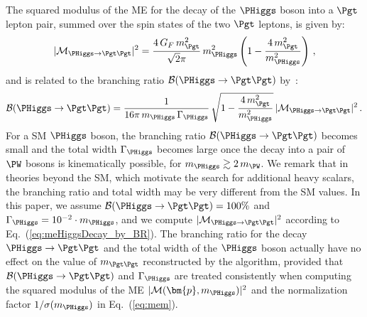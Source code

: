 The squared modulus of the ME for the decay of the $\PHiggs$ boson
into a $\Pgt$ lepton pair, summed over the spin states of the two $\Pgt$ leptons, is given by:
\begin{equation}
\vert \mathcal{M}_{\PHiggs \to \Pgt\Pgt} \vert^{2} = 
 \frac{4 \, G_{F} \, m_{\Pgt}^{2}}{\sqrt{2}\pi} \, m_{\PHiggs}^{2} \left( 1 - \frac{4 \, m_{\Pgt}^{2}}{m_{\PHiggs}^{2}} \right) \, ,
\label{eq:meHiggsDecay}
\end{equation}
and is related to the branching ratio $\mathcal{B}(\PHiggs \to \Pgt\Pgt)$
by~\cite{me_HtoTauTau}:
\begin{equation}
\mathcal{B}(\PHiggs \to \Pgt\Pgt) 
 = \frac{1}{16\pi \, m_{\PHiggs} \, \Gamma_{\PHiggs}} \, \sqrt{1 - \frac{4 \, m_{\Pgt}^{2}}{m_{\PHiggs}^{2}}} \, \vert \mathcal{M}_{\PHiggs \to \Pgt\Pgt} \vert^{2} \, .
\label{eq:meHiggsDecay_by_BR}
\end{equation}
For a SM $\PHiggs$ boson,
the branching ratio $\mathcal{B}(\PHiggs \to \Pgt\Pgt)$ becomes small and the total width $\Gamma_{\PHiggs}$ becomes large
once the decay into a pair of $\PW$ bosons is kinematically possible,
\ie for $m_{\PHiggs} \gtrsim 2 \, m_{\PW}$.
We remark that in theories beyond the SM, which motivate the search
for additional heavy scalars,
the branching ratio and total width may be very different from the SM
values.
In this paper, we assume $\mathcal{B}(\PHiggs \to \Pgt\Pgt) = 100\%$
and $\Gamma_{\PHiggs} = 10^{-2} \cdot m_{\PHiggs}$, 
and we compute $\vert \mathcal{M}_{\PHiggs \to \Pgt\Pgt} \vert^{2}$ according to Eq.~(\ref{eq:meHiggsDecay_by_BR}).
The branching ratio for the decay $\PHiggs \to \Pgt\Pgt$ and the total width of the $\PHiggs$ boson
actually have no effect on the value of $m_{\Pgt\Pgt}$ reconstructed by the algorithm, 
provided that $\mathcal{B}(\PHiggs \to \Pgt\Pgt)$ and $\Gamma_{\PHiggs}$ are treated consistently
when computing the squared modulus of the ME $\vert \mathcal{M}(\bm{p},m_{\PHiggs}) \vert^{2}$ and
the normalization factor $1/\sigma(m_{\PHiggs})$ in Eq.~(\ref{eq:mem}).

